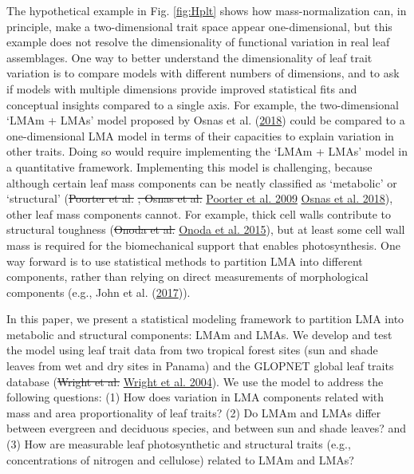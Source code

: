\documentclass[
  12pt,
]{article}
\providecommand{\DIFaddtex}[1]{{\protect\color{blue}\uwave{#1}}} %
\providecommand{\DIFdeltex}[1]{{\protect\color{red}\sout{#1}}}                      %
\providecommand{\DIFaddbegin}{} %
\providecommand{\DIFaddend}{} %
\providecommand{\DIFdelbegin}{} %
\providecommand{\DIFdelend}{} %
\providecommand{\DIFadd}[1]{\texorpdfstring{\DIFaddtex{#1}}{#1}} %
\providecommand{\DIFdel}[1]{\texorpdfstring{\DIFdeltex{#1}}{}} %
\newcommand{\DIFscaledelfig}{0.5}
\newlength{\DIFdelgraphicswidth} %
\newlength{\DIFdelgraphicsheight} %
\newcommand{\DIFaddincludegraphics}[2][]{{\color{blue}\fbox{\DIFOincludegraphics[#1]{#2}}}} %
\newcommand{\DIFdelincludegraphics}[2][]{%
\sbox{\DIFdelgraphicsbox}{\DIFOincludegraphics[#1]{#2}}%
\settoboxwidth{\DIFdelgraphicswidth}{\DIFdelgraphicsbox} %
\settoboxtotalheight{\DIFdelgraphicsheight}{\DIFdelgraphicsbox} %
\scalebox{\DIFscaledelfig}{%
\parbox[b]{\DIFdelgraphicswidth}{\usebox{\DIFdelgraphicsbox}\\[-\baselineskip] \rule{\DIFdelgraphicswidth}{0em}}\llap{\resizebox{\DIFdelgraphicswidth}{\DIFdelgraphicsheight}{%
\setlength{\unitlength}{\DIFdelgraphicswidth}%
\begin{picture}(1,1)%
\thicklines\linethickness{2pt} %
{\color[rgb]{1,0,0}\put(0,0){\framebox(1,1){}}}%
{\color[rgb]{1,0,0}\put(0,0){\line( 1,1){1}}}%
{\color[rgb]{1,0,0}\put(0,1){\line(1,-1){1}}}%
\end{picture}%
}\hspace*{3pt}}} %
} %
\DeclareRobustCommand{\DIFaddbegin}{\DIFOaddbegin \let\includegraphics\DIFaddincludegraphics} %
\DeclareRobustCommand{\DIFaddend}{\DIFOaddend \let\includegraphics\DIFOincludegraphics} %
\DeclareRobustCommand{\DIFdelbegin}{\DIFOdelbegin \let\includegraphics\DIFdelincludegraphics} %
\DeclareRobustCommand{\DIFdelend}{\DIFOaddend \let\includegraphics\DIFOincludegraphics} %
\begin{document}
The hypothetical example in Fig. \ref{fig:Hplt} shows how mass-normalization can, in principle, make a two-dimensional trait space appear one-dimensional, but this example does not resolve the dimensionality of functional variation in real leaf assemblages.
One way to better understand the dimensionality of leaf trait variation is to compare models with different numbers of dimensions, and to ask if models with multiple dimensions provide improved statistical fits and conceptual insights compared to a single axis.
For example, the two-dimensional `LMAm + LMAs' model proposed by Osnas et al. (\protect\hyperlink{ref-Osnas2018}{2018}) could be compared to a one-dimensional LMA model in terms of their capacities to explain variation in other traits.
Doing so would require implementing the `LMAm + LMAs' model in a quantitative framework.
Implementing this model is challenging, because although certain leaf mass components can be neatly classified as `metabolic' or `structural' (\DIFdelbegin \DIFdel{Poorter et al. }\DIFdelend \protect\DIFdelbegin %
\DIFdel{, Osnas et al. }\DIFdelend \DIFaddbegin \hyperlink{ref-Poorter2009}{Poorter et al. 2009}\DIFadd{, }\DIFaddend \protect\DIFdelbegin %
\DIFdelend \DIFaddbegin \hyperlink{ref-Osnas2018}{Osnas et al. 2018}\DIFaddend ), other leaf mass components cannot.
For example, thick cell walls contribute to structural toughness (\DIFdelbegin \DIFdel{Onoda et al. }\DIFdelend \protect\DIFdelbegin %
\DIFdelend \DIFaddbegin \hyperlink{ref-Onoda2015}{Onoda et al. 2015}\DIFaddend ), but at least some cell wall mass is required for the biomechanical support that enables photosynthesis.
One way forward is to use statistical methods to partition LMA into different components, rather than relying on direct measurements of morphological components (e.g., John et al. (\protect\hyperlink{ref-John2017}{2017})).

In this paper, we present a statistical modeling framework to partition LMA into metabolic and structural components: LMAm and LMAs.
We develop and test the model using leaf trait data from two tropical forest sites (sun and shade leaves from wet and dry sites in Panama) and the GLOPNET global leaf traits database (\DIFdelbegin \DIFdel{Wright et al. }\DIFdelend \protect\DIFdelbegin %
\DIFdelend \DIFaddbegin \hyperlink{ref-Wright2004a}{Wright et al. 2004}\DIFaddend ).
We use the model to address the following questions: (1) How does variation in LMA components related with mass and area proportionality of leaf traits? (2) Do LMAm and LMAs differ between evergreen and deciduous species, and between sun and shade leaves? and (3) How are measurable leaf photosynthetic and structural traits (e.g., concentrations of nitrogen and cellulose) related to LMAm and LMAs?
\end{document}
